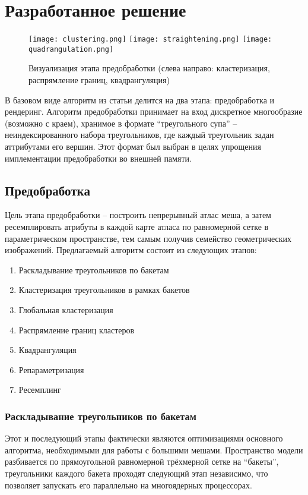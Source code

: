 
\section{Разработанное решение}
\begin{figure}
  \texttt{[image: clustering.png]}
  \texttt{[image: straightening.png]}
  \texttt{[image: quadrangulation.png]}
  \caption{Визуализация этапа предобработки (слева направо: кластеризация, распрямление границ, квадрангуляция)}
\end{figure}

В базовом виде алгоритм из статьи \cite{niski2007multi} делится на два этапа: предобработка и рендеринг. Алгоритм предобработки принимает на вход дискретное многообразие (возможно с краем), хранимое в формате ``треугольного супа'' -- неиндексированного набора треугольников, где каждый треугольник задан аттрибутами его вершин. Этот формат был выбран в целях упрощения имплементации предобработки во внешней памяти.

\subsection{Предобработка}
Цель этапа предобработки -- построить непрерывный атлас меша, а затем ресемплировать атрибуты в каждой карте атласа по равномерной сетке в параметрическом пространстве, тем самым получив семейство геометрических изображений. Предлагаемый алгоритм состоит из следующих этапов:
\begin{enumerate}
\item Раскладывание треугольников по бакетам
\item Кластеризация треугольников в рамках бакетов
\item Глобальная кластеризация
\item Распрямление границ кластеров
\item Квадрангуляция
\item Репараметризация
\item Ресемплинг
\end{enumerate}

\subsubsection{Раскладывание треугольников по бакетам}
Этот и последующий этапы фактически являются оптимизациями основного алгоритма, необходимыми для работы с большими мешами. Пространство модели разбивается по прямоугольной равномерной трёхмерной сетке на ``бакеты'', треугольники каждого бакета проходят следующий этап независимо, что позволяет запускать его параллельно на многоядерных процессорах.

